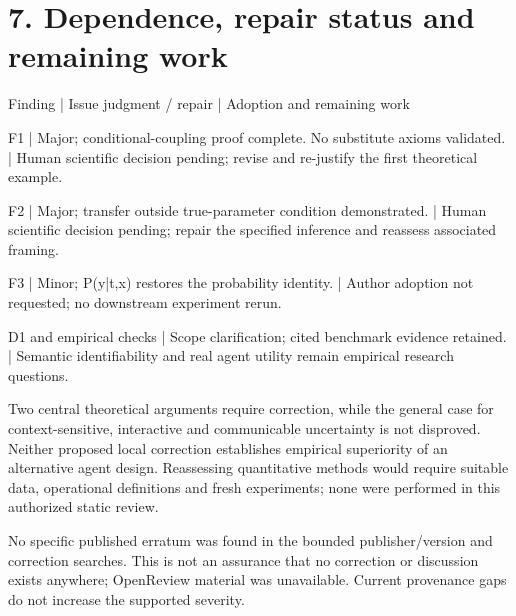 \documentclass[10pt]{article}
\begin{document}
\section*{7. Dependence, repair status and remaining work}
Finding | Issue judgment / repair | Adoption and remaining work\par
F1 | Major; conditional-coupling proof complete. No substitute axioms validated. | Human scientific decision pending; revise and re-justify the first theoretical example.\par
F2 | Major; transfer outside true-parameter condition demonstrated. | Human scientific decision pending; repair the specified inference and reassess associated framing.\par
F3 | Minor; P(y|t,x) restores the probability identity. | Author adoption not requested; no downstream experiment rerun.\par
D1 and empirical checks | Scope clarification; cited benchmark evidence retained. | Semantic identifiability and real agent utility remain empirical research questions.\par
Two central theoretical arguments require correction, while the general case for context-sensitive, interactive and communicable uncertainty is not disproved. Neither proposed local correction establishes empirical superiority of an alternative agent design. Reassessing quantitative methods would require suitable data, operational definitions and fresh experiments; none were performed in this authorized static review.\par
No specific published erratum was found in the bounded publisher/version and correction searches. This is not an assurance that no correction or discussion exists anywhere; OpenReview material was unavailable. Current provenance gaps do not increase the supported severity.\par
\end{document}
